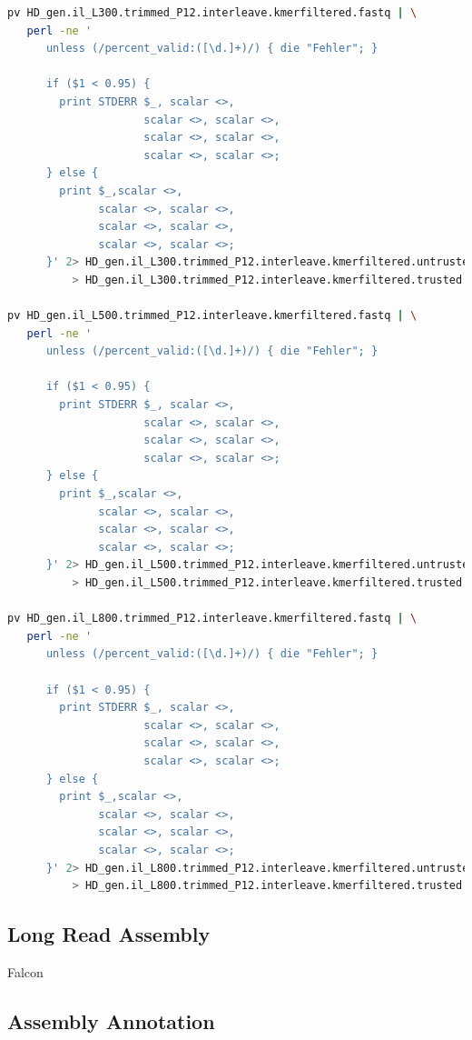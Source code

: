 \documentclass[12pt,a4paper]{scrartcl}
\begin{document}
\begin{lstlisting}[language=bash]
pv HD_gen.il_L300.trimmed_P12.interleave.kmerfiltered.fastq | \
   perl -ne '
      unless (/percent_valid:([\d.]+)/) { die "Fehler"; }

      if ($1 < 0.95) {
        print STDERR $_, scalar <>,
                     scalar <>, scalar <>,
                     scalar <>, scalar <>,
                     scalar <>, scalar <>;
      } else {
        print $_,scalar <>,
              scalar <>, scalar <>,
              scalar <>, scalar <>,
              scalar <>, scalar <>;
      }' 2> HD_gen.il_L300.trimmed_P12.interleave.kmerfiltered.untrusted.fastq \
          > HD_gen.il_L300.trimmed_P12.interleave.kmerfiltered.trusted.fastq

pv HD_gen.il_L500.trimmed_P12.interleave.kmerfiltered.fastq | \
   perl -ne '
      unless (/percent_valid:([\d.]+)/) { die "Fehler"; }

      if ($1 < 0.95) {
        print STDERR $_, scalar <>,
                     scalar <>, scalar <>,
                     scalar <>, scalar <>,
                     scalar <>, scalar <>;
      } else {
        print $_,scalar <>,
              scalar <>, scalar <>,
              scalar <>, scalar <>,
              scalar <>, scalar <>;
      }' 2> HD_gen.il_L500.trimmed_P12.interleave.kmerfiltered.untrusted.fastq \
          > HD_gen.il_L500.trimmed_P12.interleave.kmerfiltered.trusted.fastq

pv HD_gen.il_L800.trimmed_P12.interleave.kmerfiltered.fastq | \
   perl -ne '
      unless (/percent_valid:([\d.]+)/) { die "Fehler"; }

      if ($1 < 0.95) {
        print STDERR $_, scalar <>,
                     scalar <>, scalar <>,
                     scalar <>, scalar <>,
                     scalar <>, scalar <>;
      } else {
        print $_,scalar <>,
              scalar <>, scalar <>,
              scalar <>, scalar <>,
              scalar <>, scalar <>;
      }' 2> HD_gen.il_L800.trimmed_P12.interleave.kmerfiltered.untrusted.fastq \
          > HD_gen.il_L800.trimmed_P12.interleave.kmerfiltered.trusted.fastq
\end{lstlisting}

\subsection*{Long Read Assembly}

Falcon

\subsection*{Assembly Annotation}
\end{document}
